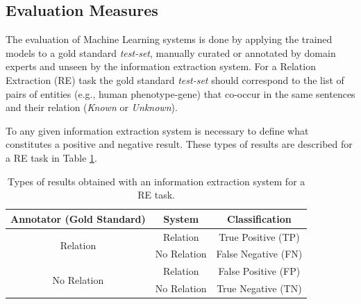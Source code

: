 \documentclass[11pt]{article}
\begin{document}
\hypertarget{3}{\subsection{Evaluation Measures}}

The evaluation of Machine Learning systems is done by applying the trained models to a gold standard \textit{test-set}, manually curated or annotated by domain experts and unseen by the information extraction system. For a Relation Extraction (RE) task the gold standard \textit{test-set} should correspond to the list of pairs of entities (e.g., human phenotype-gene) that co-occur in the same sentences and their relation (\textit{Known} or \textit{Unknown}).


To any given information extraction system is necessary to define what constitutes a positive and negative result. These types of results are described for a RE task in Table \ref{table:evaluation}.

\begin{table}[!ht]
\small
\captionsetup{font=small}
\renewcommand\thetable{2.1}
\caption{Types of results obtained with an information extraction system for a RE task.}
\centering
{}
\begin{tabular}{ |c|c|c| }
\hline
\rowcolor[HTML]{F5F5F5} \textbf{Annotator (Gold Standard)} & \textbf{System} & \textbf{Classification}\\
\hline
\multirow{2}{*}{Relation} & Relation & True Positive (TP) \\
\cline{2-3}
 & No Relation & False Negative (FN) \\ 
\hline
\multirow{2}{*}{No Relation} & Relation & False Positive (FP) \\
\cline{2-3}
 & No Relation & True Negative (TN) \\
 \hline
\end{tabular}
\label{table:evaluation}
\end{table}
\end{document}
